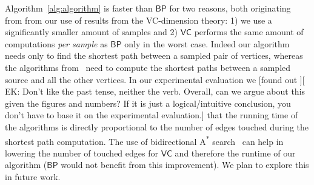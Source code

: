  Algorithm~\ref{alg:algorithm} is faster than $\mathsf{BP}$ for two reasons, both
originating from from our use of results from the VC-dimension theory: 1) we use
a significantly smaller amount of samples and 2) $\mathsf{VC}$ performs the
same amount of computations \emph{per sample} as $\mathsf{BP}$ only in the worst
case. Indeed our algorithm needs only to find the shortest path between a
sampled pair of vertices, whereas the algorithms
from~\citep{GeisbergerSS08,BrandesP07} need to compute the shortest paths
between a sampled source and all the other vertices. In our experimental
evaluation we [found out ][ EK: Don't like the past tense, neither the verb. Overall, can we argue about this given the figures and numbers?
If it is just a logical/intuitive conclusion, you don't have to base it on the experimental evaluation.] that the running time of the algorithms is directly
proportional to the number of edges touched during the shortest path
computation. The use of bidirectional A\textsuperscript{*}
search~\citep{Pohl69,KaindlK97} can help in lowering the number of touched edges
for $\mathsf{VC}$ and therefore the runtime of our algorithm ($\mathsf{BP}$
would not benefit from this improvement). %
\ifdmkd
\else
We plan to explore this in future work.
\fi



